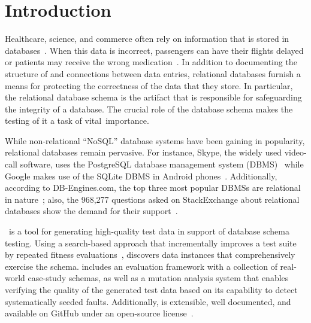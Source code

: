 \section{Introduction}\label{sec:intro}


Healthcare, science, and commerce often rely on information that is stored in
databases~\cite{kapfhammer2007comprehensive}.  When this data is incorrect, passengers can have their flights delayed or
patients may receive the wrong medication~\cite{databasebook}.  In addition to documenting the structure of and
connections between data entries, relational databases furnish a means for protecting the correctness of the data that
they store.  In particular, the relational database schema is the artifact that is responsible for safeguarding the
integrity of a database. The crucial role of the database schema makes the testing of it a task of \mbox{vital
importance}.


While non-relational ``NoSQL'' database systems have been gaining in popularity, relational databases remain pervasive.
For instance, Skype, the widely used video-call software, uses the PostgreSQL database management system
(DBMS)~\cite{postgres} while Google makes use of the SQLite DBMS in Android phones~\cite{sqlite}.  Additionally,
according to DB-Engines.com, the top three most popular DBMSs are relational in nature~\cite{dbrank}; also, the 968,277
questions asked on StackExchange about relational databases show the demand for their support~\cite{stackexchange}.



\sa~is a tool for generating high-quality test data in support of database schema testing. Using a search-based approach
that incrementally improves a test suite by repeated fitness evaluations~\cite{Korel:AVM}, {\sa} discovers data
instances that comprehensively exercise the schema.  {\sa} includes an evaluation framework with a collection of
real-world case-study schemas, as well as a mutation analysis system that enables verifying the quality of the generated
test data based on its capability to detect systematically seeded faults.  Additionally, {\sa} is extensible, well
documented, and available on GitHub under an open-source license~\cite{tool}.

